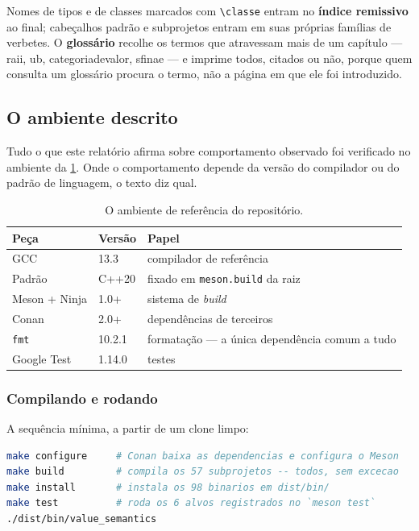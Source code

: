 Nomes de tipos e de classes marcados com \texttt{\textbackslash classe} entram
no \textbf{índice remissivo} ao final; cabeçalhos padrão e subprojetos entram em
suas próprias famílias de verbetes. O \textbf{glossário} recolhe os termos que
atravessam mais de um capítulo --- \gls{raii}, \gls{ub}, \gls{categoriadevalor},
\gls{sfinae} --- e imprime todos, citados ou não, porque quem consulta um
glossário procura o termo, não a página em que ele foi introduzido.

\subsection{O ambiente descrito}
\label{sec:ambiente}

Tudo o que este relatório afirma sobre comportamento observado foi verificado no
ambiente da \cref{tab:ambiente}. Onde o comportamento depende da versão do
compilador ou do padrão de linguagem, o texto diz qual.

\begin{table}[htbp]
\centering
\caption{O ambiente de referência do repositório.}
\label{tab:ambiente}
\footnotesize
\begin{tabular}{@{}lll@{}}
\toprule
\textbf{Peça} & \textbf{Versão} & \textbf{Papel} \\
\midrule
GCC              & 13.3    & compilador de referência \\
Padrão           & C++20   & fixado em \texttt{meson.build} da raiz \\
Meson + Ninja    & 1.0+    & sistema de \emph{build} \\
Conan            & 2.0+    & dependências de terceiros \\
\texttt{fmt}     & 10.2.1  & formatação --- a única dependência comum a tudo \\
Google Test      & 1.14.0  & testes \\
\bottomrule
\end{tabular}
\end{table}

\subsubsection{Compilando e rodando}

A sequência mínima, a partir de um clone limpo:

\begin{lstlisting}[style=bt, language=bash,
    caption={Do clone ao primeiro binário.}]
make configure     # Conan baixa as dependencias e configura o Meson
make build         # compila os 57 subprojetos -- todos, sem excecao
make install       # instala os 98 binarios em dist/bin/
make test          # roda os 6 alvos registrados no `meson test`
./dist/bin/value_semantics
\end{lstlisting}

